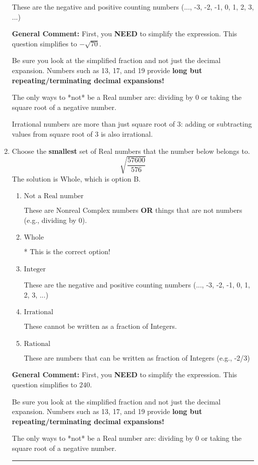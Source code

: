 \documentclass{extbook}[14pt]
\newcommand{\litem}[1]{\item #1

\rule{\textwidth}{0.4pt}}
\begin{document}
\begin{enumerate}
{\begin{enumerate}[label=\Alph*.]
These are the negative and positive counting numbers (..., -3, -2, -1, 0, 1, 2, 3, ...)
\end{enumerate}

\textbf{General Comment:} First, you \textbf{NEED} to simplify the expression. This question simplifies to $-\sqrt{70}$. 
 
 Be sure you look at the simplified fraction and not just the decimal expansion. Numbers such as 13, 17, and 19 provide \textbf{long but repeating/terminating decimal expansions!} 
 
 The only ways to *not* be a Real number are: dividing by 0 or taking the square root of a negative number. 
 
 Irrational numbers are more than just square root of 3: adding or subtracting values from square root of 3 is also irrational.
}
\litem{
Choose the \textbf{smallest} set of Real numbers that the number below belongs to.
\[ \sqrt{\frac{57600}{576}} \]
The solution is \( \text{Whole} \), which is option B.\begin{enumerate}[label=\Alph*.]
\item \( \text{Not a Real number} \)

These are Nonreal Complex numbers \textbf{OR} things that are not numbers (e.g., dividing by 0).
\item \( \text{Whole} \)

* This is the correct option!
\item \( \text{Integer} \)

These are the negative and positive counting numbers (..., -3, -2, -1, 0, 1, 2, 3, ...)
\item \( \text{Irrational} \)

These cannot be written as a fraction of Integers.
\item \( \text{Rational} \)

These are numbers that can be written as fraction of Integers (e.g., -2/3)
\end{enumerate}

\textbf{General Comment:} First, you \textbf{NEED} to simplify the expression. This question simplifies to $240$. 
 
 Be sure you look at the simplified fraction and not just the decimal expansion. Numbers such as 13, 17, and 19 provide \textbf{long but repeating/terminating decimal expansions!} 
 
 The only ways to *not* be a Real number are: dividing by 0 or taking the square root of a negative number. 
 
}
\end{enumerate}
\end{document}
